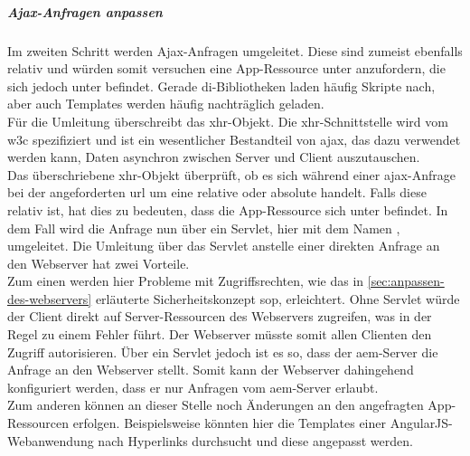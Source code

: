 \subparagraph{Ajax-Anfragen anpassen}
\label{sec:ajax-anfragen-anpassen}

Im zweiten Schritt werden Ajax-Anfragen umgeleitet. Diese sind zumeist ebenfalls relativ und würden somit versuchen eine App-Ressource unter \serverA anzufordern, die sich jedoch unter \serverB befindet. Gerade \ac{di}-Bibliotheken laden häufig Skripte nach, aber auch Templates werden häufig nachträglich geladen. \\
Für die Umleitung überschreibt  das \ac{xhr}-Objekt. Die \ac{xhr}-Schnittstelle wird vom \ac{w3c} spezifiziert und ist ein wesentlicher Bestandteil von \ac{ajax}, das dazu verwendet werden kann, Daten asynchron zwischen Server und Client auszutauschen. \\
Das überschriebene \ac{xhr}-Objekt überprüft, ob es sich während einer \ac{ajax}-Anfrage bei der angeforderten \ac{url} um eine relative oder absolute handelt. Falls diese relativ ist, hat dies zu bedeuten, dass die App-Ressource sich unter \serverB befindet. In dem Fall wird die Anfrage nun über ein Servlet, hier mit dem Namen , umgeleitet. Die Umleitung über das Servlet anstelle einer direkten Anfrage an den Webserver hat zwei Vorteile. \\
Zum einen werden hier Probleme mit Zugriffsrechten, wie das in \autoref{sec:anpassen-des-webservers} erläuterte Sicherheitskonzept \ac{sop}, erleichtert. Ohne Servlet würde der Client direkt auf Server-Ressourcen des Webservers zugreifen, was in der Regel zu einem Fehler führt. Der Webserver müsste somit allen Clienten den Zugriff autorisieren. Über ein Servlet jedoch ist es so, dass der \ac{aem}-Server die Anfrage an den Webserver stellt. Somit kann der Webserver dahingehend konfiguriert werden, dass er nur Anfragen vom \ac{aem}-Server erlaubt.\\
Zum anderen können an dieser Stelle noch Änderungen an den angefragten App-Ressourcen erfolgen. Beispielsweise könnten hier die Templates einer An\-gu\-lar\-JS-Web\-an\-wen\-dung nach Hyperlinks durchsucht und diese angepasst werden.



